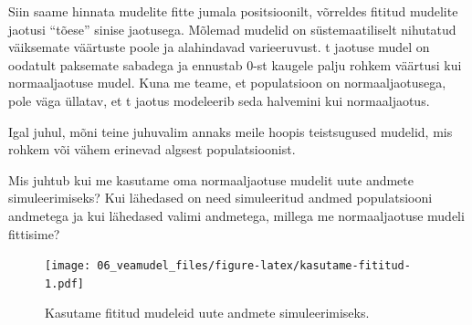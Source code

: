 \documentclass[]{book}
\newenvironment{Shaded}{\begin{snugshade}}{\end{snugshade}}
\newcommand{\KeywordTok}[1]{\textcolor[rgb]{0.13,0.29,0.53}{\textbf{#1}}}
\newcommand{\DataTypeTok}[1]{\textcolor[rgb]{0.13,0.29,0.53}{#1}}
\newcommand{\DecValTok}[1]{\textcolor[rgb]{0.00,0.00,0.81}{#1}}
\newcommand{\StringTok}[1]{\textcolor[rgb]{0.31,0.60,0.02}{#1}}
\newcommand{\CommentTok}[1]{\textcolor[rgb]{0.56,0.35,0.01}{\textit{#1}}}
\newcommand{\OperatorTok}[1]{\textcolor[rgb]{0.81,0.36,0.00}{\textbf{#1}}}
\newcommand{\NormalTok}[1]{#1}
\begin{document}
Siin saame hinnata mudelite fitte jumala positsioonilt, võrreldes
fititud mudelite jaotusi ``tõese'' sinise jaotusega. Mõlemad mudelid on
süstemaatiliselt nihutatud väiksemate väärtuste poole ja alahindavad
varieeruvust. t jaotuse mudel on oodatult paksemate sabadega ja ennustab
0-st kaugele palju rohkem väärtusi kui normaaljaotuse mudel. Kuna me
teame, et populatsioon on normaaljaotusega, pole väga üllatav, et t
jaotus modeleerib seda halvemini kui normaaljaotus.

Igal juhul, mõni teine juhuvalim annaks meile hoopis teistsugused
mudelid, mis rohkem või vähem erinevad algsest populatsioonist.

Mis juhtub kui me kasutame oma normaaljaotuse mudelit uute andmete
simuleerimiseks? Kui lähedased on need simuleeritud andmed populatsiooni
andmetega ja kui lähedased valimi andmetega, millega me normaaljaotuse
mudeli fittisime?




\begin{Shaded}
\end{Shaded}

\begin{figure}
\centering
\texttt{[image: 06\_veamudel\_files/figure-latex/kasutame-fititud-1.pdf]}
\caption{\label{fig:kasutame-fititud}Kasutame fititud mudeleid uute andmete
simuleerimiseks.}
\end{figure}
\end{document}
